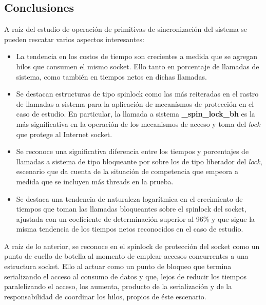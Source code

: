 \subsection{Conclusiones}
A raíz del estudio de operación de primitivas de sincronización del sistema se pueden rescatar varios aspectos interesantes:
\begin{itemize}
\item La tendencia en los costos de tiempo son crecientes a medida que se agregan hilos que consumen el mismo socket. Ello tanto en porcentaje de llamadas de sistema, como también en tiempos netos en dichas llamadas.
\item Se destacan estructuras de tipo spinlock como las más reiteradas en el rastro de llamadas a sistema para la aplicación de mecanísmos de protección en el caso de estudio. En particular, la llamada a sistema \textbf{_spin_lock_bh} es la más significativa en la operación de los mecanismos de acceso y toma del \emph{lock} que protege al Internet socket.
\item Se reconoce una significativa diferencia entre los tiempos y porcentajes de llamadas a sistema de tipo bloqueante por sobre los de tipo liberador del \emph{lock}, escenario que da cuenta de la situación de competencia que empeora a medida que se incluyen más threads en la prueba.
\item Se destaca una tendencia de naturaleza logarítmica en el crecimiento de tiempos que toman las llamadas bloqueantes sobre el spinlock del socket, ajustada con un coeficiente de determinación superior al 96\% y que sigue la misma tendencia de los tiempos netos reconocidos en el caso de estudio.
\end{itemize}
A raíz de lo anterior, se reconoce en el spinlock de protección del socket como un punto de cuello de botella al momento de emplear accesos concurrentes a una estructura socket. Ello al actuar como un punto de bloqueo que termina serializando el acceso al consumo de datos y que, lejos de reducir los tiempos paralelizando el acceso, los aumenta, producto de la serialización y de la responsabilidad de coordinar los hilos, propios de éste escenario.


